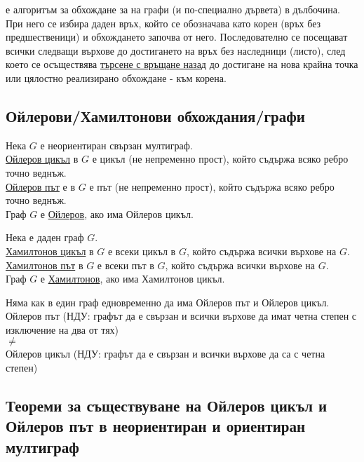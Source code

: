  е алгоритъм за обхождане за на графи (и по-специално дървета) в дълбочина. 
При него се избира даден връх, който се обозначава като корен (връх без предшественици) и обхождането 
започва от него. Последователно се посещават всички следващи върхове до достигането на връх без 
наследници (листо), след което се осъществява \underline{търсене с връщане назад} до достигане на нова 
крайна точка или цялостно реализирано обхождане - към корена.

\subsection{Ойлерови/Хамилтонови обхождания/графи}

\begin{definition}
    Нека \(G\) е неориентиран свързан мултиграф. \\
    \underline{Ойлеров цикъл} в \(G\) е цикъл (не непременно прост), който съдържа всяко ребро точно веднъж. \\
    \underline{Ойлеров път} е в \(G\) е път (не непременно прост), който съдържа всяко ребро точно веднъж. \\
    Граф \(G\) е \underline{Ойлеров}, ако има Ойлеров цикъл.
\end{definition}

\begin{definition}
    Нека е даден граф \(G\). \\
    \underline{Хамилтонов цикъл} в \(G\) е всеки цикъл в \(G\), който съдържа всички върхове на \(G\). \\
    \underline{Хамилтонов път} в \(G\) е всеки път в \(G\), който съдържа всички върхове на \(G\). \\
    Граф \(G\) е \underline{Хамилтонов}, ако има Хамилтонов цикъл.
\end{definition}

\begin{note}
    Няма как в един граф едновременно да има Ойлеров път и Ойлеров цикъл. \\
    Ойлеров път (НДУ: графът да е свързан и всички върхове да имат четна степен с изключение на два от тях) 
    \\ \(\not = \) \\
    Ойлеров цикъл (НДУ: графът да е свързан и всички върхове да са с четна степен)
\end{note}

\subsection{Теореми за съществуване на Ойлеров цикъл и Ойлеров път в неориентиран и ориентиран мултиграф}

